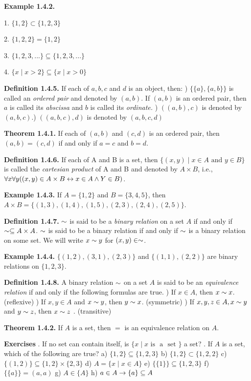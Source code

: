 \begin{large}
\textbf{Example 1.4.2.}

1.  $\{1, 2\} \subset \{1, 2, 3\}$\nl

2.  $\{1, 2, 2\}=\{1, 2\}$\nl

3.  $\{1,2,3, ... \} \subseteq \{1,2,3, ... \}$\nl

4.  $\{x \mid x > 2\} \subseteq \{x \mid x > 0\}$\nl


\textbf{Definition 1.4.5.} If each of $a, b, c$ and $d$ is an object, then: ) $\{\{a\},\{a,b \}\}$ is called an \textit{ordered pair} and denoted by $(a,b)$. If $(a,b)$ is an ordered pair, then $a$ is called its \textit{abscissa} and $b$ is called its \textit{ordinate.} ) $((a,b),c)$ is denoted by $(a,b,c)$.) $((a,b,c),d)$ is denoted by $(a,b,c,d)$\nl

\textbf{Theorem 1.4.1.} If each of $(a,b)$ and $(c,d)$ is an ordered pair, then $(a,b)=(c,d)$ if and only if $a =c$ and $b = d$.\nl

\textbf{Definition 1.4.6.} If each of A and B is a set, then $\{(x,y)  \mid x \in A \text{~and~} y \in B\}$ is called the \textit{cartesian product} of A and B and denoted by $A \times  B$, i.e., $\forall x \forall y((x,y) \in A \times B \leftrightarrow x \in A \wedge Y \in B)$.\nl

\textbf{Example 1.4.3.} If $A= \{1,2\}$ and $B= \{3,4,5\}$, then $A \times B =\{(1,3), (1,4), (1,5), (2,3), (2,4), (2,5)\}$. \nl

\textbf{Definition 1.4.7.} $\sim$ is said to be a \textit{binary relation} on a set $A$ if and only if $\sim \subseteq A \times A$. $\sim$ is said to be a binary relation if and only if $\sim$ is a binary relation on some set. We will write $x \sim y$ for $(x,y) \in \sim $. \nl

\textbf{Example 1.4.4.} $\{(1,2), (3,1), (2,3)\}$ and $\{(1,1), (2,2)\}$ are binary relations on $\{1,2,3\}$.\nl

\newpage
\textbf{Definition 1.4.8.} A binary relation $\sim$ on a set $A$ is said to be an
\textit{equivalence relation} if and only if the following formulas are true. ) If $x \in A$, then $x \sim x$. (reflexive)  ) If $x,y \in A$ and $x \sim y$, then $y \sim x$. (symmetric) ) If $x, y, z \in A, x \sim y$ and $ y \sim z$, then $x \sim z$ . (transitive) \nl

\textbf{Theorem 1.4.2.} If $A$ is a set, then $=$ is an equivalence relation on $A$.\nl

\textbf{Exercises} . If no set can contain itself, is $\{x \mid x \text{~is~ a~ set~}\}$ a set?  . If $A$ is a set, which of the following are true? \nl
a) $\{1,2\} \subseteq \{1,2,3\}$ \nl
b) $\{1,2\} \subset \{ 1,2,2\}$ \nl
c) $\{(1,2)\} \subseteq \{1,2\} \times \{2,3\}$ \nl
d) $A=\{x \mid x \in A\}$ \nl
e) $\{\{1\}\} \subseteq \{1, 2, 3\}$ \nl
f) $\{\{a\} \} = (a,a)$ \nl
g) $A \in \{A\}$ \nl
h) $a \in A \to \{a\} \subseteq A$ \nl


\end{large}
